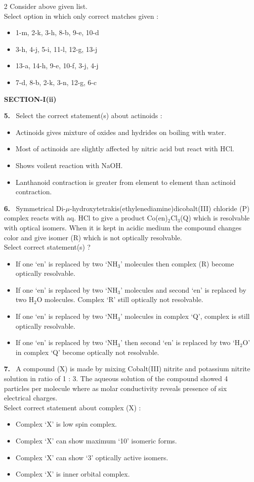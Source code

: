 \documentclass[10pt]{extarticle}
\newcommand{\sect}[1]{\par\smallskip\noindent\textbf{#1}\par}
\newcommand{\qn}[1]{\par\smallskip\noindent\textbf{#1.}~}
\newenvironment{qoptions}{\begin{itemize}[leftmargin=1.8em,itemsep=1pt,topsep=2pt,label={}]}{\end{itemize}}
\newcommand{\opt}[2]{\item[(#1)] #2}
\begin{document}
\begin{multicols}{2}
Consider above given list.\\
Select option in which only correct matches given :
\begin{qoptions}
\opt{A}{1-m, 2-k, 3-h, 8-b, 9-e, 10-d}
\opt{B}{3-h, 4-j, 5-i, 11-l, 12-g, 13-j}
\opt{C}{13-a, 14-h, 9-e, 10-f, 3-j, 4-j}
\opt{D}{7-d, 8-b, 2-k, 3-n, 12-g, 6-c}
\end{qoptions}
\sect{SECTION-I(ii)}
\qn{5} Select the correct statement(s) about actinoids :
\begin{qoptions}
\opt{A}{Actinoids gives mixture of oxides and hydrides on boiling with water.}
\opt{B}{Most of actinoids are slightly affected by nitric acid but react with HCl.}
\opt{C}{Shows voilent reaction with NaOH.}
\opt{D}{Lanthanoid contraction is greater from element to element than actinoid contraction.}
\end{qoptions}
\qn{6} Symmetrical Di-$\mu$-\allowbreak hydroxytetrakis\allowbreak (ethylenediamine)\allowbreak dicobalt(III) chloride (P) complex reacts with aq. HCl to give a product Co(en)$_2$Cl$_3$(Q) which is resolvable with optical isomers. When it is kept in acidic medium the compound changes color and give isomer (R) which is not optically resolvable.\\
Select correct statement(s) ?
\begin{qoptions}
\opt{A}{If one `en' is replaced by two `NH$_3$' molecules then complex (R) become optically resolvable.}
\opt{B}{If one `en' is replaced by two `NH$_3$' molecules and second `en' is replaced by two H$_2$O molecules. Complex `R' still optically not resolvable.}
\opt{C}{If one `en' is replaced by two `NH$_3$' molecules in complex `Q', complex is still optically resolvable.}
\opt{D}{If one `en' is replaced by two `NH$_3$' then second `en' is replaced by two `H$_2$O' in complex `Q' become optically not resolvable.}
\end{qoptions}
\qn{7} A compound (X) is made by mixing Cobalt(III) nitrite and potassium nitrite solution in ratio of 1 : 3. The aqueous solution of the compound showed 4 particles per molecule where as molar conductivity reveals presence of six electrical charges.\\
Select correct statement about complex (X) :
\begin{qoptions}
\opt{A}{Complex `X' is low spin complex.}
\opt{B}{Complex `X' can show maximum `10' isomeric forms.}
\opt{C}{Complex `X' can show `3' optically active isomers.}
\opt{D}{Complex `X' is inner orbital complex.}
\end{qoptions}

\end{multicols}
\end{document}
